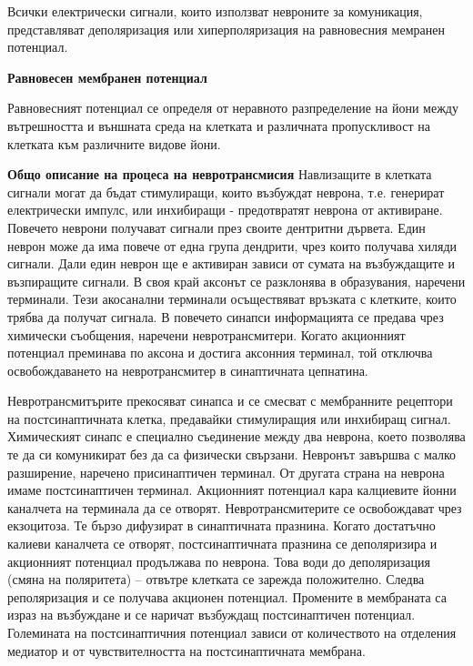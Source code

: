\documentclass{article}
\begin{document}
Всички електрически сигнали, които използват невроните за комуникация, представляват деполяризация или хиперполяризация на равновесния мемранен потенциал.

\vspace{5mm} %
\textbf{Равновесен мембранен потенциал}

Равновесният потенциал се определя от неравното разпределение на йони между вътрешността и външната среда на клетката и различната пропускливост на клетката към различните видове йони.

\vspace{5mm} %
\textbf{Общо описание на процеса на невротрансмисия}
Навлизащите в клетката сигнали могат да бъдат стимулиращи, които възбуждат неврона, т.е. генерират електрически импулс, или инхибиращи - предотвратят неврона от активиране. Повечето неврони получават сигнали през своите дентритни дървета. Един неврон може да има повече от една група дендрити, чрез които получава хиляди сигнали. Дали един неврон ще е активиран зависи от сумата на възбуждащите и възпиращите сигнали.
В своя край аксонът се разклонява в образувания, наречени терминали. Тези акосанални терминали осъществяват връзката с клетките, които трябва да получат сигнала. В повечето синапси информацията се предава чрез химически съобщения, наречени невротрансмитери. Когато акционният потенциал преминава по аксона и достига аксонния терминал, той отключва освобождаването на невротрансмитер в синаптичната цепнатина.

Невротрансмитърите прекосяват синапса и се смесват с мембранните рецептори на постсинаптичната клетка, предавайки стимулиращия или инхибиращ сигнал. Химическият синапс е специално съединение между два неврона, което позволява те да си комуникират без да са физически свързани. Невронът завършва с малко разширение, наречено присинаптичен терминал. От другата страна на неврона имаме постсинаптичен терминал. Акционният потенциал кара калциевите йонни каналчета на терминала да се отворят. Невротрансмитерите се освобождават чрез екзоцитоза. Те бързо дифузират в синаптичната празнина. Когато достатъчно калиеви каналчета се отворят, постсинаптичната празнина се деполяризира и акционният потенциал продължава по неврона. Това води до деполяризация (смяна на поляритета) -- отвътре клетката се зарежда положително. Следва реполяризация и се получава акционен потенциал. Промените в мембраната  са израз на възбуждане и се наричат възбуждащ постсинаптичен потенциал. Големината на постсинаптичния потенциал зависи от количеството на отделения медиатор и от чувствителността на постсинаптичната мембрана.
\end{document}
